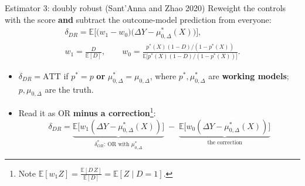 \documentclass[
  11pt,
  ignorenonframetext,
  aspectratio=169,
]{beamer}
\providecommand{\tightlist}{%
  \setlength{\itemsep}{0pt}\setlength{\parskip}{0pt}}
\begin{document}
\begin{frame}{Estimator 3: doubly robust (Sant'Anna and Zhao 2020)}
\protect{}\label{estimator-3-doubly-robust-santanna-and-zhao-2020}
Reweight the controls with the score \textbf{and} subtract the
outcome-model prediction from everyone: \[
\begin{gathered}
\delta_{DR} = \mathbb{E}\Big[\big(w_1 - w_0\big)\big(\Delta Y - \mu^*_{0,\Delta}(X)\big)\Big], \\
w_1 = \frac{D}{\mathbb{E}[D]}, \qquad w_0 = \frac{p^*(X)(1-D)/(1-p^*(X))}{\mathbb{E}\big[p^*(X)(1-D)/(1-p^*(X))\big]} .
\end{gathered}
\]

\begin{itemize}
\tightlist
\item
  \(\delta_{DR} = \text{ATT}\) if \(p^* = p\) \textbf{or}
  \(\mu^*_{0,\Delta} = \mu_{0,\Delta}\), where \(p^*, \mu^*_{0,\Delta}\)
  are \textbf{working models}; \(p, \mu_{0,\Delta}\) are the truth.
\item
  Read it as OR \textbf{minus a
  correction}\footnote{Note $\mathbb{E}[w_1 Z] = \frac{\mathbb{E}[D\,Z]}{\mathbb{E}[D]} = \mathbb{E}[Z \mid D = 1].$}:
  \[
  \delta_{DR} = \underbrace{\mathbb{E}\big[w_1(\Delta Y - \mu^*_{0,\Delta}(X))\big]}_{\delta^*_{OR}:\ \text{OR with } \mu^*_{0,\Delta}} \;-\; \underbrace{\mathbb{E}\big[w_0(\Delta Y - \mu^*_{0,\Delta}(X))\big]}_{\text{the correction}}
  \]
\end{itemize}
\end{frame}
\end{document}
